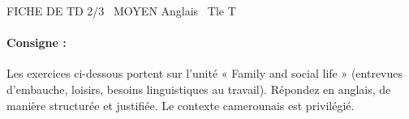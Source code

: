 \documentclass[11pt]{article}
\begin{document}
\begin{tcolorbox}[enhanced,colback=popink,colframe=popink,arc=10pt,boxrule=0pt,left=12pt,right=12pt,top=9pt,bottom=9pt]
{\color{white}\popxbold\small FICHE DE TD 2/3 \textbullet\ MOYEN \hfill Anglais \textbullet\ Tle T\par}
\end{tcolorbox}
\vspace{4pt}
\paragraph{Consigne :} Les exercices ci-dessous portent sur l'unité « Family and social life » (entrevues d'embauche, loisirs, besoins linguistiques au travail). Répondez en anglais, de manière structurée et justifiée. Le contexte camerounais est privilégié.
\end{document}
